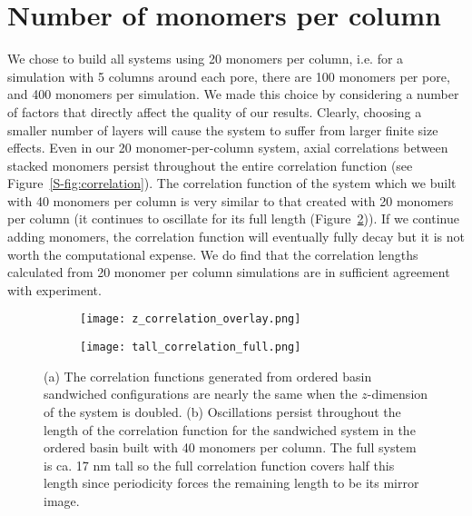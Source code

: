   \section{Number of monomers per column}\label{S-section:monomers_per_column}
  
  We chose to build all systems using 20 monomers per column, i.e. for a simulation with 5 
  columns around each pore, there are 100 monomers per pore, and 400 monomers per simulation.  We made this choice
  by considering a number of factors that directly affect the quality of our results. 
  Clearly, choosing a smaller number of layers will cause the system to suffer from 
  larger finite size effects. Even in our 20 monomer-per-column system, axial correlations
  between stacked monomers persist throughout the entire correlation function (see
  Figure~\ref{S-fig:correlation}). The correlation function of the system which we
  built with 40 monomers per column is very similar to that created with 20 monomers
  per column (it continues to oscillate for its full length
  (Figure~\ref{S-fig:tall_correlation_full})). If we continue adding monomers, the 
  correlation function will eventually fully decay but it is not worth the 
  computational expense. We do find that the correlation lengths calculated from 20
  monomer per column simulations are in sufficient agreement with experiment. 

  \begin{figure}[!htb]
  \centering
  \begin{subfigure}{0.45\textwidth}
  \texttt{[image: z\_correlation\_overlay.png]}
  \caption{}\label{S-fig:z_correlation_overlay}
  \end{subfigure}
  \begin{subfigure}{0.45\textwidth}
  \texttt{[image: tall\_correlation\_full.png]}
  \caption{}\label{S-fig:tall_correlation_full}
  \end{subfigure}
  \caption{(a) The correlation functions generated from ordered basin sandwiched 
  configurations are nearly the same when the $z$-dimension of the system is doubled.
  (b) Oscillations persist throughout the length of the correlation function for the
  sandwiched system in the ordered basin built with 40 monomers per column. The full
  system is ca. 17 nm tall so the full correlation function covers half this length
  since periodicity forces the remaining length to be its mirror image.}\label{S-fig:correlation_functions}
  \end{figure}
  

